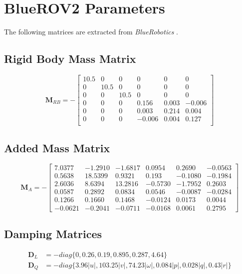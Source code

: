 \chapter{BlueROV2 Parameters}
The following matrices are extracted from \textit{BlueRobotics} \cite{blue}.
\section{Rigid Body Mass Matrix}
\begin{equation}
    \mathbf{M}_{RB} = - \begin{bmatrix}
    10.5 & 0 & 0 & 0 & 0 & 0 \\
    0 & 10.5 & 0 & 0 & 0 & 0 \\
    0 & 0 & 10.5 & 0 & 0 & 0 \\
    0 & 0 & 0 & 0.156 & 0.003 & -0.006 \\
    0 & 0 & 0 & 0.003 & 0.214 & 0.004 \\
    0 & 0 & 0 & -0.006 & 0.004 & 0.127 \\
    \end{bmatrix}
\end{equation}
\section{Added Mass Matrix}
\begin{equation}
    \mathbf{M}_{A} = - \begin{bmatrix}
    7.0377 & -1.2910 & -1.6817 & 0.0954 & 0.2690 & -0.0563 \\
    0.5638 & 18.5399 & 0.9321 & 0.193 & -0.1080 & -0.1984 \\
    2.6036 & 8.6394 & 13.2816 & -0.5730 & -1.7952 & 0.2603 \\
    0.0587 & 0.2892 & 0.0834 & 0.0546 & -0.0087 & -0.0284 \\
    0.1266 & 0.1660 & 0.1468 & -0.0124 & 0.0173 & 0.0044 \\
    -0.0621 & -0.2041 & -0.0711 & -0.0168 & 0.0061 & 0.2795 
    \end{bmatrix}
\end{equation}
\section{Damping Matrices}
\begin{align}
    \mathbf{D}_{L} & = -diag\{0, 0.26, 0.19, 0.895, 0.287, 4.64\} \\
    \mathbf{D}_{Q} & = -diag\{3.96|u|, 103.25|v|, 74.23|\omega|, 0.084|p|, 0.028|q|, 0.43|r|\}
\end{align}